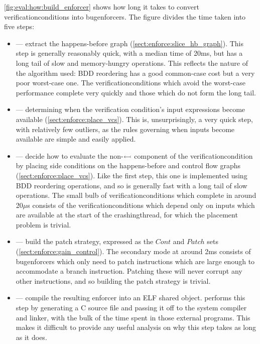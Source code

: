 \noindent
\autoref{fig:eval:how:build_enforcer} shows how long it takes to
convert \glspl{verificationcondition} into \glspl{bugenforcer}.  The
figure divides the time taken into five steps:
\begin{itemize}
\item {} --- extract the happens-before graph
  (\autoref{sect:enforce:slice_hb_graph}).  This step is generally
  reasonably quick, with a median time of 20ms, but has a long tail of
  slow and memory-hungry operations.  This reflects the nature of the
  algorithm used: BDD reordering has a good common-case cost but a
  very poor worst-case one.  The \glspl{verificationcondition} which
  avoid the worst-case performance complete very quickly and those
  which do not form the long tail.
\item {} --- determining when the verification condition's
  input expressions become available
  (\autoref{sect:enforce:place_vcs}).  This is, unsurprisingly, a very
  quick step, with relatively few outliers, as the rules governing
  when inputs become available are simple and easily applied.
\item {} --- decide how to evaluate the
  non-$\leftarrowtail$ component of the
  \gls{verificationcondition} by placing \glspl{side condition} on the
  happens-before and control flow graphs
  (\autoref{sect:enforce:place_vcs}).  Like the first step, this one
  is implemented using BDD reordering operations, and so is generally
  fast with a long tail of slow operations.  The small bulb of
  \glspl{verificationcondition} which complete in around 20$\mu$s
  consists of the \glspl{verificationcondition} which depend only on
  inputs which are available at the start of the \gls{crashingthread},
  for which the placement problem is trivial.
\item {} --- build the patch strategy, expressed as the
  $\mathit{Cont}$ and $\mathit{Patch}$ sets
  (\autoref{sect:enforce:gain_control}).  The secondary mode at around
  2ms consists of \glspl{bugenforcer} which only need to patch
  instructions which are large enough to accommodate a branch
  instruction.  Patching these will never corrupt any other
  instructions, and so building the patch strategy is trivial.
\item {} --- compile the resulting enforcer into an ELF shared
  object.  {\Implementation} performs this step by generating a C
  source file and passing it off to the system compiler and linker,
  with the bulk of the time spent in those external programs.  This
  makes it difficult to provide any useful analysis on why this step
  takes as long as it does.
\end{itemize}
